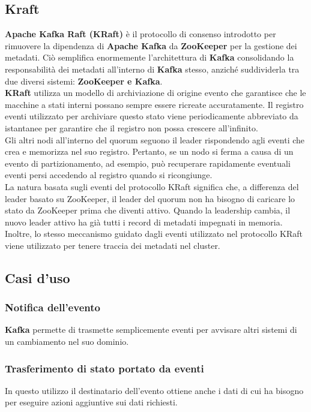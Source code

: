 \documentclass{article}
\begin{document}
\subsection{Kraft}
\textbf{Apache Kafka Raft (KRaft)} è il protocollo di consenso introdotto per rimuovere la dipendenza di \textbf{Apache Kafka} da \textbf{ZooKeeper} per la gestione dei metadati. Ciò semplifica enormemente l'architettura di \textbf{Kafka} consolidando la responsabilità dei metadati all'interno di \textbf{Kafka} stesso, anziché suddividerla tra due diversi sistemi: \textbf{ZooKeeper e Kafka}.\\
\textbf{KRaft} utilizza un modello di archiviazione di origine evento che garantisce che le macchine a stati interni possano sempre essere ricreate accuratamente. Il registro eventi utilizzato per archiviare questo stato
 viene periodicamente abbreviato da istantanee per garantire che il registro non possa crescere all'infinito.\\ Gli altri nodi all'interno del quorum seguono il leader  rispondendo agli eventi che crea e memorizza nel suo registro. Pertanto, se un nodo si ferma a causa di un evento di partizionamento, ad esempio, può recuperare rapidamente eventuali eventi persi accedendo al registro quando si ricongiunge. \\
 La natura basata sugli eventi del protocollo KRaft significa che, a differenza del leader basato su ZooKeeper, il leader del quorum non ha bisogno di caricare lo stato da ZooKeeper prima che diventi attivo. Quando la leadership cambia, il nuovo leader attivo ha già tutti i record di metadati impegnati in memoria. Inoltre, lo stesso meccanismo guidato dagli eventi utilizzato nel protocollo KRaft viene utilizzato per tenere traccia dei metadati nel cluster. 
\subsection{Casi d'uso}
\subsubsection{Notifica dell'evento}
\textbf{Kafka} permette di trasmette semplicemente eventi per avvisare altri sistemi di un cambiamento nel suo dominio.
\subsubsection{Trasferimento di stato portato da eventi}
In questo utilizzo il destinatario dell'evento ottiene anche i dati di cui ha bisogno per eseguire azioni aggiuntive sui dati richiesti.
\end{document}
